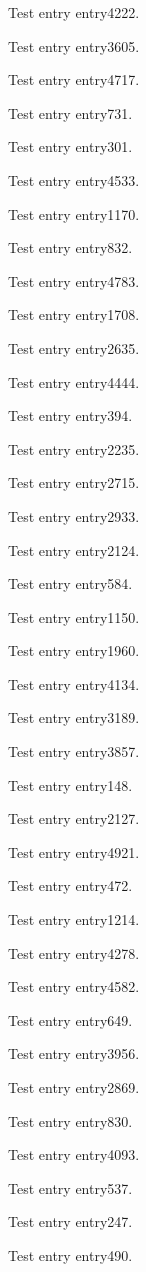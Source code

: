 Test entry \gls{entry4222}.

Test entry \gls{entry3605}.

Test entry \gls{entry4717}.

Test entry \gls{entry731}.

Test entry \gls{entry301}.

Test entry \gls{entry4533}.

Test entry \gls{entry1170}.

Test entry \gls{entry832}.

Test entry \gls{entry4783}.

Test entry \gls{entry1708}.

Test entry \gls{entry2635}.

Test entry \gls{entry4444}.

Test entry \gls{entry394}.

Test entry \gls{entry2235}.

Test entry \gls{entry2715}.

Test entry \gls{entry2933}.

Test entry \gls{entry2124}.

Test entry \gls{entry584}.

Test entry \gls{entry1150}.

Test entry \gls{entry1960}.

Test entry \gls{entry4134}.

Test entry \gls{entry3189}.

Test entry \gls{entry3857}.

Test entry \gls{entry148}.

Test entry \gls{entry2127}.

Test entry \gls{entry4921}.

Test entry \gls{entry472}.

Test entry \gls{entry1214}.

Test entry \gls{entry4278}.

Test entry \gls{entry4582}.

Test entry \gls{entry649}.

Test entry \gls{entry3956}.

Test entry \gls{entry2869}.

Test entry \gls{entry830}.

Test entry \gls{entry4093}.

Test entry \gls{entry537}.

Test entry \gls{entry247}.

Test entry \gls{entry490}.


